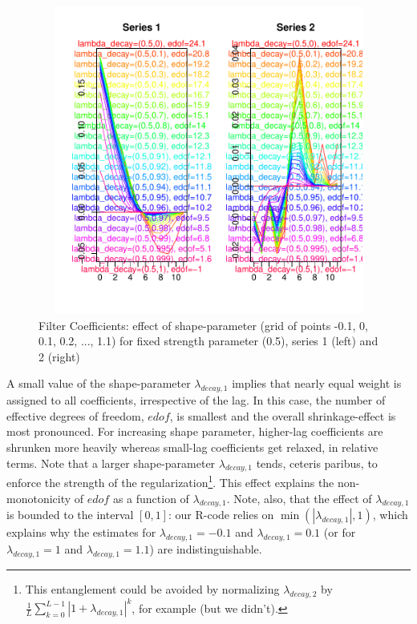 \documentclass[a4paper]{book}
\begin{document}
\begin{figure}[H]\begin{center}\includegraphics[height=4in, width=6in]{z_mdfa_ms_reg_decay_screen_decay_1}\caption{Filter Coefficients: effect of shape-parameter (grid of points -0.1, 0, 0.1, 0.2, ..., 1.1) for fixed strength parameter (0.5), series 1 (left) and 2 (right)\label{z_mdfa_ms_reg_decay_screen_decay_1}}\end{center}\end{figure}A small value of the shape-parameter $\lambda_{decay,1}$ implies that nearly equal weight is assigned to all coefficients, irrespective of the lag. In this case, the number of effective degrees of freedom, $edof$, is smallest and the overall shrinkage-effect is most pronounced. For increasing shape parameter, higher-lag coefficients are shrunken more heavily whereas small-lag coefficients get relaxed, in relative terms. Note that a larger shape-parameter $\lambda_{decay,1}$ tends, ceteris paribus, to enforce the strength of the regularization\footnote{This entanglement could be avoided by normalizing $\lambda_{decay,2}$ by $\frac{1}{L}\sum_{k=0}^{L-1}|1+\lambda_{decay,1}|^k$, for example (but we didn't).}. This effect explains the non-monotonicity of $edof$ as a function of $\lambda_{decay,1}$. Note, also, that the effect of $\lambda_{decay,1}$ is bounded to the interval $[0,1]$: our R-code relies on $\min(|\lambda_{decay,1}|,1)$, which explains why the estimates for $\lambda_{decay,1}=-0.1$ and $\lambda_{decay,1}=0.1$ (or for $\lambda_{decay,1}=1$ and $\lambda_{decay,1}=1.1$) are indistinguishable. \\
\end{document}
